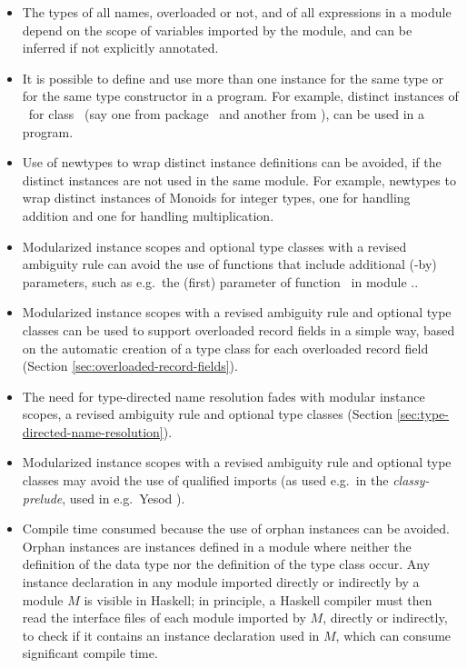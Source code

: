 \begin{itemize}

  \item The types of all names, overloaded or not, and of all
    expressions in a module depend on the scope of variables imported
    by the module, and can be inferred if not explicitly annotated.

  \item It is possible to define and use more than one instance for
    the same type or for the same type constructor in a program. For
    example, distinct instances of \Either\ for class \Monad\ (say one
    from package \mtl\ and another from \transformers), can be used in
    a program.

  \item Use of newtypes to wrap distinct instance definitions can be
    avoided, if the distinct instances are not used in the same
    module. For example, newtypes to wrap distinct instances of
    Monoids for integer types, one for handling addition and one for
    handling multiplication.
    
  \item Modularized instance scopes and optional type classes with a
    revised ambiguity rule can avoid the use of functions that include
    additional (-by) parameters, such as e.g.~the (first) parameter of
    function \sortBy\ in module \Data.\List.

  \item Modularized instance scopes with a revised ambiguity rule and
    optional type classes can be used to support overloaded record
    fields in a simple way, based on the automatic creation of a type
    class for each overloaded record field (Section
    \ref{sec:overloaded-record-fields}).

  \item The need for type-directed name resolution fades with modular
    instance scopes, a revised ambiguity rule and optional type
    classes (Section \ref{sec:type-directed-name-resolution}).
    
  \item Modularized instance scopes with a revised ambiguity rule and
    optional type classes may avoid the use of qualified imports (as
    used e.g.~in the {\em classy-prelude}, used in e.g.~Yesod
    \cite{Yesod}).

  \item Compile time consumed because the use of orphan instances can
    be avoided.  Orphan instances are instances defined in a module
    where neither the definition of the data type nor the definition
    of the type class occur. Any instance declaration in any module
    imported directly or indirectly by a module $M$ is visible in
    Haskell; in principle, a Haskell compiler must then read the
    interface files of each module imported by $M$, directly or
    indirectly, to check if it contains an instance declaration used
    in $M$, which can consume significant compile time.
    
\end{itemize}

